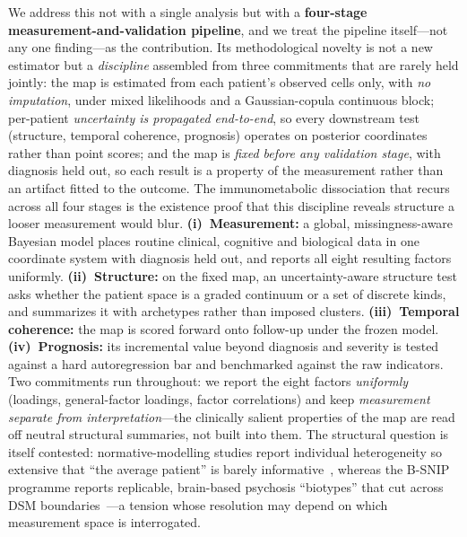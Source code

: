We address this not with a single analysis but with a \textbf{four-stage
measurement-and-validation pipeline}, and we treat the pipeline itself---not any one
finding---as the contribution. Its methodological novelty is not a new estimator but a
\emph{discipline} assembled from three commitments that are rarely held jointly: the map is
estimated from each patient's observed cells only, with \emph{no imputation}, under mixed
likelihoods and a Gaussian-copula continuous block; per-patient \emph{uncertainty is propagated
end-to-end}, so every downstream test (structure, temporal coherence, prognosis) operates on
posterior coordinates rather than point scores; and the map is \emph{fixed
before any validation stage}, with diagnosis held out, so each result is a property of the
measurement rather than an artifact fitted to the outcome. The immunometabolic dissociation that
recurs across all four stages is the existence proof that this discipline reveals structure a
looser measurement would blur. \textbf{(i)~Measurement:} a global, missingness-aware Bayesian
model places routine clinical, cognitive and biological data in one coordinate system with
diagnosis held out, and reports all eight resulting factors uniformly. \textbf{(ii)~Structure:}
on the fixed map, an uncertainty-aware structure test asks whether the patient space is a graded
continuum or a set of discrete kinds, and summarizes it with archetypes rather than imposed
clusters. \textbf{(iii)~Temporal coherence:} the map is scored forward onto follow-up under the
frozen model. \textbf{(iv)~Prognosis:} its incremental value beyond diagnosis and severity is
tested against a hard autoregression bar and benchmarked against the raw indicators.
Two commitments run throughout: we report the eight factors
\emph{uniformly} (loadings, general-factor loadings, factor correlations) and keep
\emph{measurement separate from interpretation}---the clinically salient properties of the map
are read off neutral structural summaries, not built into them. The structural question is itself
contested: normative-modelling studies report individual heterogeneity so extensive that
``the average patient'' is barely informative~\citep{wolfers2018,marquand2016}, whereas the
B-SNIP programme reports replicable, brain-based psychosis ``biotypes'' that cut across DSM
boundaries~\citep{clementz2016biotypes,clementz2020,clementz2024}---a tension whose
resolution may depend on which measurement space is interrogated.

